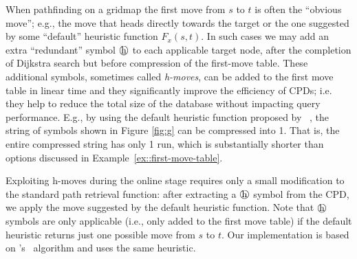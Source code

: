 
When pathfinding on a gridmap the first move from $s$ to 
$t$ is often the ``obvious move''; e.g., the move that heads 
directly towards the target or the one suggested by some ``default'' 
heuristic function $F_x(s, t)$.
In such cases we may add an extra ``redundant'' symbol $\heur$ to each 
applicable target node, after the completion of Dijkstra search but before compression
of the first-move table.
These additional symbols, sometimes called \emph{h-moves}, can be added to the
first move table in linear time and they significantly
improve the efficiency of CPDs; i.e. they help to reduce the 
total size of the database without impacting query performance.
%
E.g., by using the default heuristic function proposed by \citeauthor{icaps19b}~, the string of symbols shown in Figure \ref{fig:g} can be compressed into 1\heur. That is, the entire compressed string has only 1 run,
  which is substantially shorter than options discussed in Example~\ref{ex::first-move-table}.
  
Exploiting h-moves during the online stage requires only a small modification to
the standard path retrieval function: after extracting a $\heur$ symbol from
the CPD, we apply the move suggested by the default heuristic function.
Note that $\heur$ symbols are only applicable (i.e., only added to the first move table)
if the default heuristic returns just one possible move from $s$ to $t$.
Our implementation is based on \citeauthor{icaps19b}'s~ algorithm and uses the
same heuristic.  

